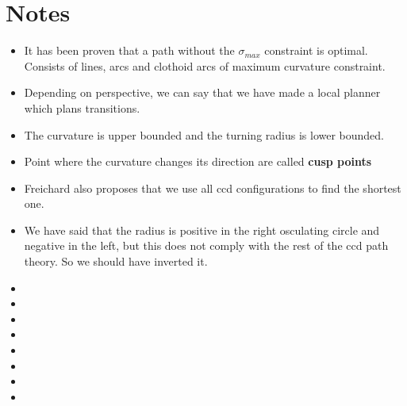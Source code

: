 \documentclass[a4paper]{article}
\begin{document}
\section{Notes}
\begin{itemize}
	\item It has been proven that a path without the $ \sigma_{max} $ constraint is optimal. Consists of lines, arcs and clothoid arcs of maximum curvature constraint. 
	\item Depending on perspective, we can say that we have made a local planner which plans transitions. 
	\item The curvature is upper bounded and the turning radius is lower bounded. 
	\item Point where the curvature changes its direction are called \textbf{cusp points} 
	\item Freichard also proposes that we use all ccd configurations to find the shortest one. 
	\item We have said that the radius is positive in the right osculating circle and negative in the left, but this does not comply with the rest of the ccd path theory. So we should have inverted it. 
	\item 
	\item 
	\item 
	\item 
	\item 
	\item 
	\item 
	\item 
\end{itemize}
\end{document}
